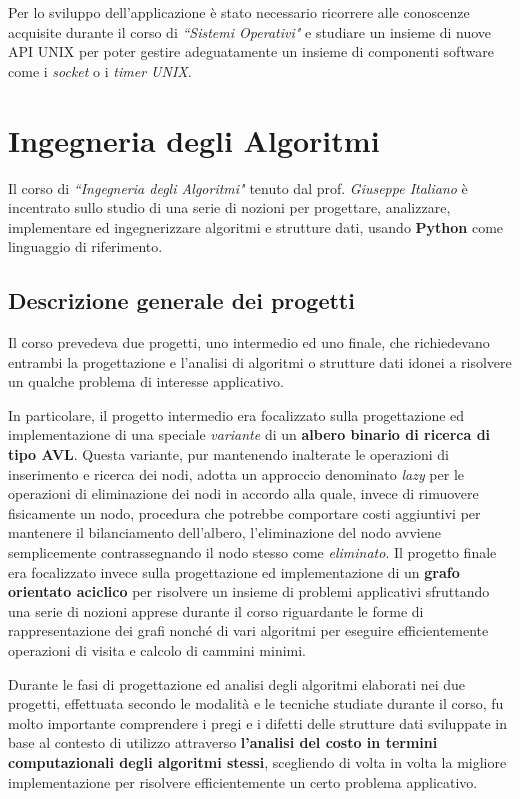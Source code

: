 \documentclass[10pt,a4paper, titlepage]{article}
\begin{document}
Per lo sviluppo dell'applicazione è stato necessario ricorrere alle conoscenze acquisite durante il corso di \textit{``Sistemi Operativi"} e studiare un insieme di nuove API UNIX per poter gestire adeguatamente un insieme di componenti software come i \textit{socket} o i \textit{timer UNIX}.


\newpage
\section{Ingegneria degli Algoritmi}

Il corso di \textit{``Ingegneria degli Algoritmi"} tenuto dal prof. \textit{Giuseppe Italiano} è incentrato sullo studio di una serie di nozioni per progettare, analizzare, implementare ed ingegnerizzare algoritmi e strutture dati, usando \textbf{Python} come linguaggio di riferimento. 

\subsection{Descrizione generale dei progetti}

Il corso prevedeva due progetti, uno intermedio ed uno finale, che richiedevano entrambi la progettazione e l'analisi di algoritmi o strutture dati idonei a risolvere un qualche problema di interesse applicativo. 

In particolare, il progetto intermedio era focalizzato sulla progettazione ed implementazione di una speciale \textit{variante} di un \textbf{albero binario di ricerca di tipo AVL}. Questa variante, pur mantenendo inalterate le operazioni di inserimento e ricerca dei nodi, adotta un approccio denominato \textit{lazy} per le operazioni di eliminazione dei nodi in accordo alla quale, invece di rimuovere fisicamente un nodo, procedura che potrebbe comportare costi aggiuntivi per mantenere il bilanciamento dell'albero, l'eliminazione del nodo avviene semplicemente contrassegnando il nodo stesso come \textit{eliminato}. Il progetto finale era focalizzato invece sulla progettazione ed implementazione di un \textbf{grafo orientato aciclico} per risolvere un insieme di problemi applicativi sfruttando una serie di nozioni apprese durante il corso riguardante le forme di rappresentazione dei grafi nonché di vari algoritmi per eseguire efficientemente operazioni di visita e calcolo di cammini minimi.

Durante le fasi di progettazione ed analisi degli algoritmi elaborati nei due progetti, effettuata secondo le modalità e le tecniche studiate durante il corso, fu molto importante comprendere i pregi e i difetti delle strutture dati sviluppate in base al contesto di utilizzo attraverso \textbf{l'analisi del costo in termini computazionali degli algoritmi stessi}, scegliendo di volta in volta la migliore implementazione per risolvere efficientemente un certo problema applicativo. 
\end{document}
